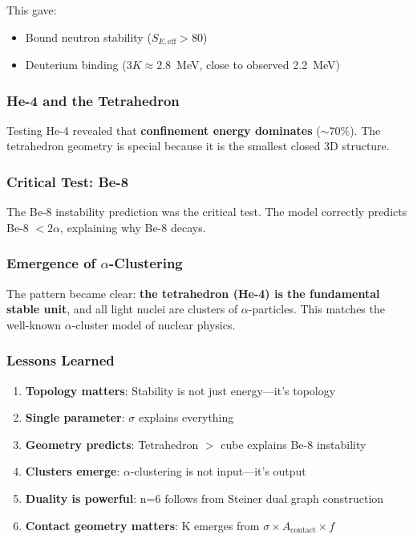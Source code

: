 This gave:
\begin{itemize}
    \item Bound neutron stability ($S_{E,\text{eff}} > 80$)
    \item Deuterium binding ($3K \approx 2.8$~MeV, close to observed 2.2~MeV)
\end{itemize}

\subsubsection{He-4 and the Tetrahedron}

Testing He-4 revealed that \textbf{confinement energy dominates} ($\sim 70\%$). The tetrahedron geometry is special because it is the smallest closed 3D structure.

\subsubsection{Critical Test: Be-8}

The Be-8 instability prediction was the critical test. The model correctly predicts Be-8 $< 2\alpha$, explaining why Be-8 decays.

\subsubsection{Emergence of $\alpha$-Clustering}

The pattern became clear: \textbf{the tetrahedron (He-4) is the fundamental stable unit}, and all light nuclei are clusters of $\alpha$-particles. This matches the well-known $\alpha$-cluster model of nuclear physics.

\subsubsection{Lessons Learned}

\begin{enumerate}
    \item \textbf{Topology matters}: Stability is not just energy---it's topology
    \item \textbf{Single parameter}: $\sigma$ explains everything
    \item \textbf{Geometry predicts}: Tetrahedron $>$ cube explains Be-8 instability
    \item \textbf{Clusters emerge}: $\alpha$-clustering is not input---it's output
    \item \textbf{Duality is powerful}: n=6 follows from Steiner dual graph construction
    \item \textbf{Contact geometry matters}: K emerges from $\sigma \times A_{\text{contact}} \times f$
\end{enumerate}

